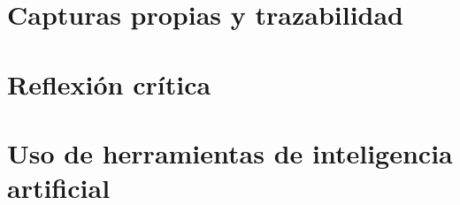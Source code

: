 \documentclass[11pt,a4paper]{article}
\begin{document}
\section{Capturas propias y trazabilidad}


\section{Reflexión crítica}


\section{Uso de herramientas de inteligencia artificial}


\begingroup\footnotesize\sloppy\printbibliography[title={Referencias (estilo IEEE)}]\endgroup
\end{document}
